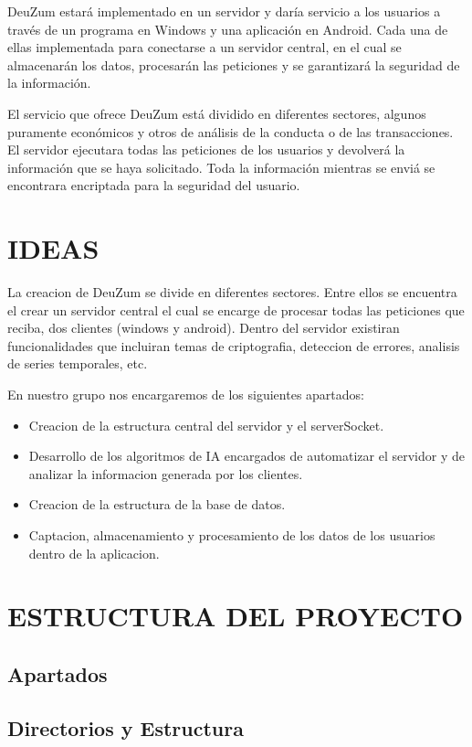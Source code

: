 \documentclass{article}
\theoremstyle{definition}
\begin{document}
DeuZum estará implementado en un servidor y daría servicio a los usuarios a través de un programa en Windows y una aplicación en Android. Cada una de ellas implementada para conectarse a un servidor central, en el cual se almacenarán los datos, procesarán las peticiones y se garantizará la seguridad de la información.

El servicio que ofrece DeuZum está dividido en diferentes sectores, algunos puramente económicos y otros de análisis de la conducta o de las transacciones. El servidor ejecutara todas las peticiones de los usuarios y devolverá la información que se haya solicitado. Toda la información mientras se enviá se encontrara encriptada para la seguridad del usuario.

\section{IDEAS}

La creacion de DeuZum se divide en diferentes sectores. Entre ellos se encuentra el crear un servidor central el cual se encarge de procesar todas las peticiones que reciba, dos clientes (windows y android). Dentro del servidor existiran funcionalidades que incluiran temas de criptografia, deteccion de errores, analisis de series temporales, etc.

En nuestro grupo nos encargaremos de los siguientes apartados:
\begin{itemize}
\item Creacion de la estructura central del servidor y el serverSocket.
\item Desarrollo de los algoritmos de IA encargados de automatizar el servidor y de analizar la informacion generada por los clientes.
\item Creacion de la estructura de la base de datos.
\item Captacion, almacenamiento y procesamiento de los datos de los usuarios dentro de la aplicacion.
\end{itemize}

\section{ESTRUCTURA DEL PROYECTO}

\subsection{Apartados}

\subsection{Directorios y Estructura}
\end{document}
